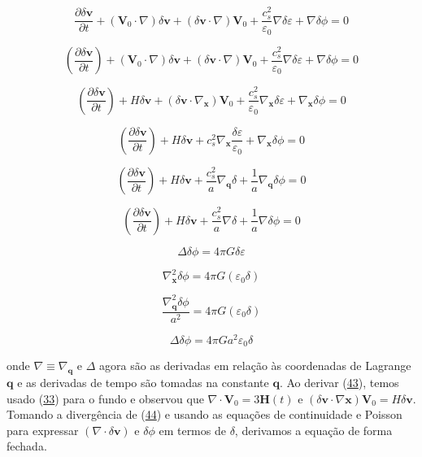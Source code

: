\documentclass[a4paper,12pt]{article}
\begin{document}
$$\dfrac{\partial\delta\mathbf{v}}{\partial t} + (\mathbf{V}_0 \cdot \nabla)\delta\mathbf{v} + (\delta\mathbf{v} \cdot \nabla) \mathbf{V}_0 + \dfrac{c^2_s}{\varepsilon_0}\nabla\delta\varepsilon + \nabla\delta\phi = 0$$

$$\left( \dfrac{\partial\delta\mathbf{v}}{\partial t} \right) + (\mathbf{V}_0 \cdot \nabla)\delta\mathbf{v} + (\delta\mathbf{v} \cdot \nabla) \mathbf{V}_0 + \dfrac{c^2_s}{\varepsilon_0}\nabla\delta\varepsilon + \nabla\delta\phi = 0$$

$$\left( \dfrac{\partial\delta\mathbf{v}}{\partial t} \right) +H\delta\mathbf{v} + (\delta\mathbf{v} \cdot \nabla_\mathbf{x}) \mathbf{V}_0 + \dfrac{c^2_s}{\varepsilon_0}\nabla_\mathbf{x}\delta\varepsilon + \nabla_\mathbf{x}\delta\phi = 0$$

$$\left( \dfrac{\partial\delta\mathbf{v}}{\partial t} \right) +H\delta\mathbf{v} + c^2_s\nabla_\mathbf{x}\dfrac{\delta\varepsilon}{\varepsilon_0} + \nabla_\mathbf{x}\delta\phi = 0$$

$$\left( \dfrac{\partial\delta\mathbf{v}}{\partial t} \right) +H\delta\mathbf{v} + \dfrac{c^2_s}{a}\nabla_\mathbf{q}\delta + \dfrac{1}{a}\nabla_\mathbf{q}\delta\phi = 0$$

\begin{equation}\label{eq44}
	\left( \dfrac{\partial \delta\mathbf{v}}{\partial t} \right) +H\delta\mathbf{v}+\dfrac{c^2_s}{a}\nabla\delta + \dfrac{1}{a}\nabla\delta\phi =0
\end{equation}
\newline


$$\Delta\delta\phi = 4\pi G\delta\varepsilon$$

$$\nabla^2_\mathbf{x}\delta\phi = 4\pi G(\varepsilon_0\delta)$$

$$\dfrac{\nabla^2_\mathbf{q}\delta\phi}{a^2} = 4\pi G(\varepsilon_0\delta)$$

\begin{equation}\label{eq45}
	\Delta\delta\phi = 4\pi Ga^2\varepsilon_0\delta
\end{equation}

onde $\nabla\equiv\nabla_\mathbf{q}$ e $\Delta$ agora são as derivadas em relação às coordenadas de Lagrange $\mathbf{q}$ e as derivadas de tempo são tomadas na constante $\mathbf{q}$. Ao derivar (\hyperref[eq43]{43}), temos usado (\hyperref[eq33]{33}) para o fundo e observou que $\nabla\cdot\mathbf{V}_0 = 3\mathbf{H}(t)$ e $(\delta\mathbf{v}\cdot\nabla\mathbf{x}) \mathbf{V}_0 = H\delta\mathbf{v}$.
Tomando a divergência de (\hyperref[eq44]{44}) e usando as equações de continuidade e Poisson para
expressar $(\nabla\cdot\delta\mathbf{v})$ e $\delta\phi$ em termos de $\delta$, derivamos a equação de forma fechada.
\end{document}
